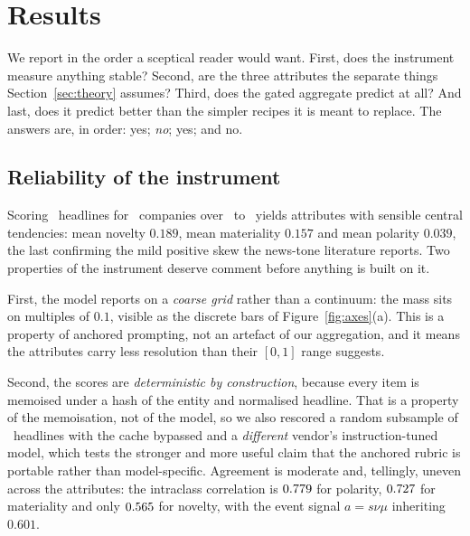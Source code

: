 \documentclass[preprint,12pt,authoryear]{elsarticle}
\theoremstyle{plain}
\theoremstyle{remark}
\begin{document}
\section{Results}\label{sec:results}

We report in the order a sceptical reader would want. First, does the instrument
measure anything stable? Second, are the three attributes the separate things
Section~\ref{sec:theory} assumes? Third, does the gated aggregate predict at
all? And last, does it predict better than the simpler recipes it is meant to
replace. The answers are, in order: yes; \emph{no}; yes; and no.

\subsection{Reliability of the instrument}\label{sec:reliability}

Scoring \ScoredHeadlines\ headlines for \NCompanies\ companies over \PanelStart\
to \PanelEnd\ yields attributes with sensible central tendencies: mean novelty
$0.189$, mean materiality $0.157$ and mean polarity $0.039$, the last confirming
the mild positive skew the news-tone literature reports. Two properties of the
instrument deserve comment before anything is built on it.

First, the model reports on a \emph{coarse grid} rather than a continuum: the
mass sits on multiples of $0.1$, visible as the discrete bars of
Figure~\ref{fig:axes}(a). This is a property of anchored prompting, not an
artefact of our aggregation, and it means the attributes carry less resolution
than their $[0,1]$ range suggests.

Second, the scores are \emph{deterministic by construction}, because every item
is memoised under a hash of the entity and normalised headline. That is a
property of the memoisation, not of the model, so we also rescored a random
subsample of \RetestN\ headlines with the cache bypassed and a \emph{different}
vendor's instruction-tuned model, which tests the stronger and more useful claim
that the anchored rubric is portable rather than model-specific. Agreement is
moderate and, tellingly, uneven across the attributes: the intraclass
correlation \citep{shrout1979} is $0.779$ for polarity, $0.727$ for materiality
and only $0.565$ for novelty, with the event signal $a=s\nu\mu$ inheriting
$0.601$.
\end{document}
